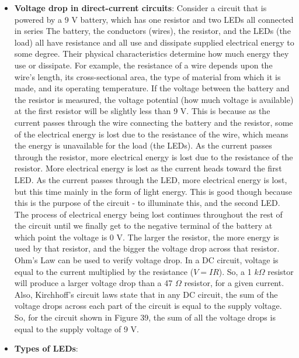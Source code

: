 \documentclass{report}
\begin{document}
\begin{itemize}
        \item \textbf{Voltage drop in direct-current circuits}: Consider a circuit that is powered by a 9 V battery, which has one resistor and two LEDs all connected in series
            \bigbreak \noindent 
            \bigbreak \noindent 
            The battery, the conductors (wires), the resistor, and the LEDs (the load) all have resistance and all use and dissipate supplied electrical energy to some degree. Their physical characteristics determine how much energy they use or dissipate. For example, the resistance of a wire depends upon the wire's length, its cross-sectional area, the type of material from which it is made, and its operating temperature.
            \bigbreak \noindent 
            If the voltage between the battery and the resistor is measured, the voltage potential (how much voltage is available) at the first resistor will be slightly less than 9 V. This is because as the current passes through the wire connecting the battery and the resistor, some of the electrical energy is lost due to the resistance of the wire, which means the energy is unavailable for the load (the LEDs). As the current passes through the resistor, more electrical energy is lost due to the resistance of the resistor. More electrical energy is lost as the current heads toward the first LED. As the current passes through the LED, more electrical energy is lost, but this time mainly in the form of light energy. This is good though because this is the purpose of the circuit - to illuminate this, and the second LED. The process of electrical energy being lost continues throughout the rest of the circuit until we finally get to the negative terminal of the battery at which point the voltage is 0 V.
            \bigbreak \noindent 
            The larger the resistor, the more energy is used by that resistor, and the bigger the voltage drop across that resistor.
            \bigbreak \noindent 
            Ohm's Law can be used to verify voltage drop. In a DC circuit, voltage is equal to the current multiplied by the resistance ($V = IR$). So, a 1 $k\Omega$ resistor will produce a larger voltage drop than a 47 $\Omega$ resistor, for a given current. Also, Kirchhoff's circuit laws state that in any DC circuit, the sum of the voltage drops across each part of the circuit is equal to the supply voltage. So, for the circuit shown in Figure 39, the sum of all the voltage drops is equal to the supply voltage of 9 V.
        \item \textbf{Types of LEDs}:

\end{itemize}
\end{document}
